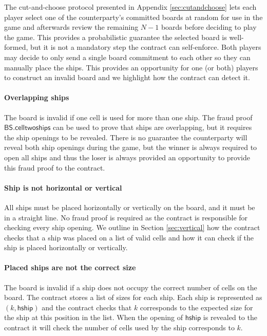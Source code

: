 \documentclass{llncs}
\newcommand{\hship}{\mathsf{hship}}
\newcommand{\battleshiptwoships}{\mathsf{BS.celltwoships}}
\begin{document}
	The cut-and-choose protocol presented in Appendix \ref{sec:cutandchoose} lets each player select one of the counterparty's committed boards at random for use in the game and afterwards review the remaining $N-1$ boards before deciding to play the game. 
	This provides a probabilistic guarantee the selected board is well-formed, but it is not a mandatory step the contract can self-enforce. 
	Both players may decide to only send a single board commitment to each other so they can manually place the ships. 
	This provides an opportunity for one (or both) players to construct an invalid board and we highlight how the contract can detect it.  
	
	\paragraph{Overlapping ships}
	The board is invalid if one cell is used for more than one ship. 
	The fraud proof $\battleshiptwoships$ can be used to prove that ships are overlapping, but it requires the ship openings to be revealed. 
	There is no guarantee the counterparty will reveal both ship openings during the game, but the winner is always required to open all ships and thus the loser is always provided an opportunity to provide this fraud proof to the contract. 
	
	\paragraph{Ship is not horizontal or vertical}
	All ships must be placed horizontally or vertically on the board, and it must be in a straight line. 
	No fraud proof is required as the contract is responsible for checking every ship opening. 
	We outline in Section \ref{sec:vertical} how the contract checks that a ship was placed on a list of valid cells and how it can check if the ship is placed horizontally or vertically. 
	
	\paragraph{Placed ships are not the correct size} 
	The board is invalid if a ship does not occupy the correct number of cells on the board. 
	The contract stores a list of sizes for each ship. 
	Each ship is represented as $(k,\hship)$ and the contract checks that $k$ corresponds to the expected size for the ship at this position in the list. 
	When the opening of $\hship$ is revealed to the contract it will check the number of cells used by the ship corresponds to $k$. 
	
\end{document}
